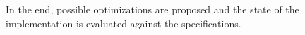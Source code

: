 In the end, possible optimizations are proposed and the state of the implementation is evaluated against the specifications.

\sffamily{
	\begin{center}
		\textbf{\documentAuthor{}}\\
		\textsc{\university{}}\\
		\universityFaculty{}---\universityDepartment{}\\
		\documentTitle{}\\
		\germanDate{}\today{}\\
		\bigskip{}
	\end{center}
}
